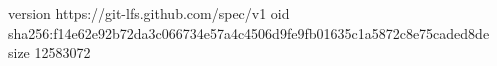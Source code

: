 version https://git-lfs.github.com/spec/v1
oid sha256:f14e62e92b72da3c066734e57a4c4506d9fe9fb01635c1a5872c8e75caded8de
size 12583072
